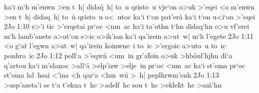 ka`i
m`h
m'enwn
>en
t~h|
dida\r{q}~h|
to~u
qristo~u
vje`on
o>uk
>'eqei
<o
m'enwn
>en
t~h|
didaq~h|
to~u\r{}
qristo~u
o<~utoc
ka`i
t`on
pat'era\r{}
ka`i
t`on
u<i`on
>'eqei\bibvsend
\vs 2Jo 1:10
e>'i
tic
>'erqetai
pr`oc
<um~ac
ka`i
ta'uthn
t`hn
didaq`hn
o>u
vf'erei
m`h
lamb'anete
a>ut`on
e>ic
o>ik'ian
ka`i
qa'irein
a>ut~w|
m`h
l'egete\bibvsend
\vs 2Jo 1:11
<o
g`ar\r{}
l'egwn
a>ut~w|
qa'irein
koinwne~i
to~ic
>'ergoic
a>uto~u
to~ic
ponhro~ic\bibvsend
\vs 2Jo 1:12
poll`a
>'eqw\r{n}
<um~in
gr'a\r{f}ein
o>uk
>hb\r{o}ul'hjhn
di`a
q'artou
ka`i
m'elanoc
>all`a\r{}
>elp'izw
>elje~in
pr`oc
<um~ac
ka`i
st'oma
pr`oc
st'oma
lal~hsai
<'ina
<h
qar`a
<hm~wn\r{}
>~h|
peplhrwm'enh\bibvsend
\vs 2Jo 1:13
>asp'azeta'i
se
t`a
t'ekna
t~hc
>adelf~hc
sou
t~hc
>ekle\r{k}t~hc
>a\r{m}'hn\bibvsend
{}
